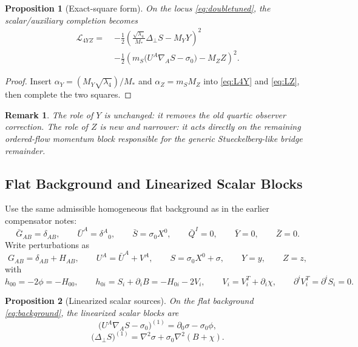 \documentclass[11pt]{article}
\newtheorem{proposition}{Proposition}
\newtheorem{remark}{Remark}
\begin{document}
\begin{proposition}[Exact-square form]
\label{prop:square}
On the locus \eqref{eq:doubletuned}, the scalar/auxiliary completion becomes
\begin{align}
\mathcal L_{4YZ}
=\;&
-\frac12
\left(
\frac{\sqrt{\lambda_4}}{M_*}\Delta_\perp S-M_YY
\right)^2
\nonumber\\
&-\frac12
\left(
m_S\bigl(U^A\nabla_A S-\sigma_0\bigr)-M_ZZ
\right)^2.
\label{eq:doublesquare}
\end{align}
\end{proposition}

\begin{proof}
Insert \(\alpha_Y=(M_Y\sqrt{\lambda_4})/M_*\) and \(\alpha_Z=m_SM_Z\) into \eqref{eq:L4Y} and \eqref{eq:LZ}, then complete the two squares.
\end{proof}

\begin{remark}
The role of \(Y\) is unchanged: it removes the old quartic observer correction. The role of \(Z\) is new and narrower: it acts directly on the remaining ordered-flow momentum block responsible for the generic Stueckelberg-like bridge remainder.
\end{remark}

\subsection{Flat Background and Linearized Scalar Blocks}

Use the same admissible homogeneous flat background as in the earlier compensator notes:
\begin{equation}
\bar G_{AB}=\delta_{AB},
\qquad
\bar U^A=\delta^A{}_0,
\qquad
\bar S=\sigma_0X^0,
\qquad
\bar Q^I=0,
\qquad
\bar Y=0,
\qquad
\bar Z=0.
\label{eq:background}
\end{equation}
Write perturbations as
\begin{equation}
G_{AB}=\delta_{AB}+H_{AB},
\qquad
U^A=\bar U^A+V^A,
\qquad
S=\sigma_0X^0+\sigma,
\qquad
Y=y,
\qquad
Z=z,
\label{eq:perturbations}
\end{equation}
with
\begin{equation}
h_{00}=-2\phi=-H_{00},
\qquad
h_{0i}=S_i+\partial_iB=-H_{0i}-2V_i,
\qquad
V_i=V_i^T+\partial_i\chi,
\qquad
\partial^iV_i^T=\partial^iS_i=0.
\label{eq:metricpert}
\end{equation}

\begin{proposition}[Linearized scalar sources]
\label{prop:linops}
On the flat background \eqref{eq:background}, the linearized scalar blocks are
\begin{equation}
\bigl(U^A\nabla_A S-\sigma_0\bigr)^{(1)}
=
\partial_0\sigma-\sigma_0\phi,
\label{eq:Psilin}
\end{equation}
\begin{equation}
\bigl(\Delta_\perp S\bigr)^{(1)}
=
\nabla^2\sigma+\sigma_0\nabla^2(B+\chi).
\label{eq:Xilin}
\end{equation}
\end{proposition}
\end{document}
